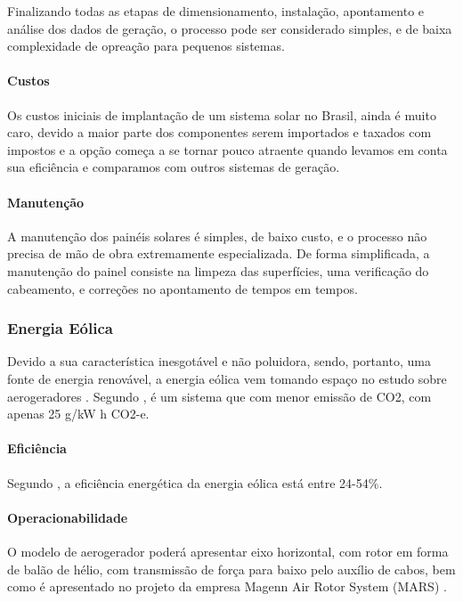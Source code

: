   Finalizando todas as etapas de dimensionamento, instalação, apontamento e análise dos dados de geração, o processo pode ser considerado simples, e de baixa complexidade de opreação para pequenos sistemas.
    
  \paragraph{Custos}
  Os custos iniciais de implantação de um sistema solar no Brasil, ainda é muito caro, devido a maior parte dos componentes serem importados e taxados com impostos e a opção começa a se tornar pouco atraente quando levamos em conta sua eficiência e comparamos com outros sistemas de geração.
  
  \paragraph{Manutenção}
  A manutenção dos painéis solares é simples, de baixo custo, e o processo não precisa de mão de obra extremamente especializada. De forma simplificada, a manutenção do painel consiste na limpeza das superfícies, uma verificação do cabeamento, e correções no apontamento de tempos em tempos.
  
\subsubsection{Energia Eólica}
  Devido a sua característica inesgotável e não poluidora, sendo, portanto, uma fonte de energia renovável, a energia eólica vem tomando espaço no estudo sobre aerogeradores \cite{rocha2010}. Segundo \cite{Evans20091082}, é um sistema que com menor emissão de CO2, com apenas 25 g/kW h CO2-e.
  
  \paragraph{Eficiência}
  Segundo \cite{Evans20091082}, a eficiência energética da energia eólica está entre 24-54\%.
  
  \paragraph{Operacionabilidade}
  O modelo de aerogerador poderá apresentar eixo horizontal, com rotor em forma de balão de hélio, com transmissão de força para baixo pelo auxílio de cabos, bem como é apresentado no projeto da empresa Magenn Air Rotor System (MARS) \cite{texeira2012}.
  
